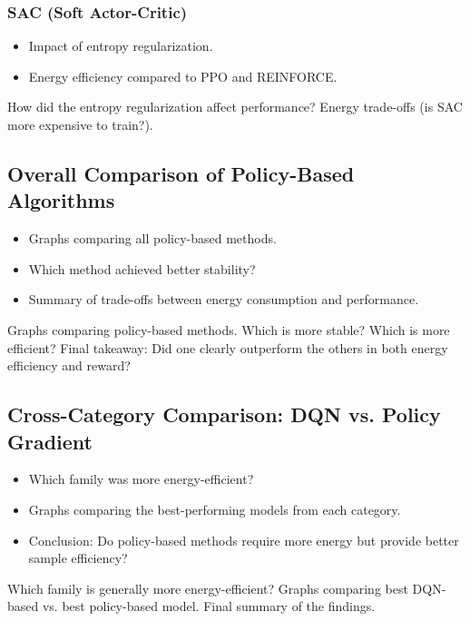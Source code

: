 \subsubsection{SAC (Soft Actor-Critic)}
\label{subsubsec:sac}
\begin{itemize}
	\item Impact of entropy regularization.
	\item Energy efficiency compared to PPO and REINFORCE.
\end{itemize}
How did the entropy regularization affect performance?
Energy trade-offs (is SAC more expensive to train?).


\subsection{Overall Comparison of Policy-Based Algorithms}
\begin{itemize}
	\item Graphs comparing all policy-based methods.
	\item Which method achieved better stability?
	\item Summary of trade-offs between energy consumption and performance.
\end{itemize}
Graphs comparing policy-based methods.
Which is more stable? Which is more efficient?
Final takeaway: Did one clearly outperform the others in both energy efficiency and reward?


\subsection{Cross-Category Comparison: DQN vs. Policy Gradient}
\begin{itemize}
	\item Which family was more energy-efficient?
	\item Graphs comparing the best-performing models from each category.
	\item Conclusion: Do policy-based methods require more energy but provide better sample efficiency?
\end{itemize}
Which family is generally more energy-efficient?
Graphs comparing best DQN-based vs. best policy-based model.
Final summary of the findings.